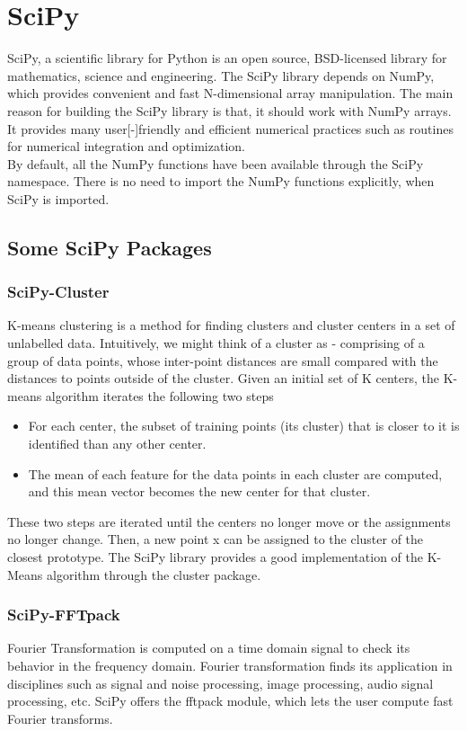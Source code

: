 \section*{SciPy}

SciPy, a scientific library for Python is an open source, BSD{-}licensed library for mathematics, science and engineering. The SciPy library depends on NumPy, which provides convenient and fast N{-}dimensional array manipulation. The main reason for building the SciPy library is that, it should work with NumPy arrays. It provides many user[-]friendly and efficient numerical practices such as routines for numerical integration and optimization.\\
By default, all the NumPy functions have been available through the SciPy namespace. There is no need to import the NumPy functions explicitly, when SciPy is imported.

\subsection*{Some SciPy Packages}
\subsubsection*{SciPy{-}Cluster}
K{-}means clustering is a method for finding clusters and cluster centers in a set of unlabelled data. Intuitively, we might think of a cluster as {-} comprising of a group of data points, whose inter{-}point distances are small compared with the distances to points outside of the cluster. Given an initial set of K centers, the K{-}means algorithm iterates the following two steps
\begin{itemize}
    \item For each center, the subset of training points (its cluster) that is closer to it is identified than any other center.
    \item The mean of each feature for the data points in each cluster are computed, and this mean vector becomes the new center for that cluster.
\end{itemize}
These two steps are iterated until the centers no longer move or the assignments no longer change. Then, a new point x can be assigned to the cluster of the closest prototype. The SciPy library provides a good implementation of the K{-}Means algorithm through the cluster package.

\subsubsection*{SciPy{-}FFTpack}
Fourier Transformation is computed on a time domain signal to check its behavior in the frequency domain. Fourier transformation finds its application in disciplines such as signal and noise processing, image processing, audio signal processing, etc. SciPy offers the fftpack module, which lets the user compute fast Fourier transforms.

